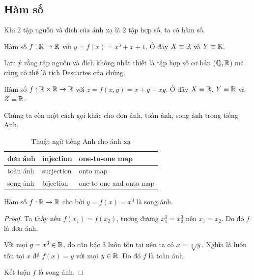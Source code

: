 \subsection*{Hàm số}

Khi 2 tập nguồn và đích của ánh xạ là 2 tập hợp số, ta có hàm số.

\begin{example}
    Hàm số $f: \mathbb{R} \rightarrow \mathbb{R}$ với $y = f(x) = x^3 + x + 1$. Ở đây $X \equiv \mathbb{R}$ và $Y \equiv \mathbb{R}$.
\end{example}

Lưu ý rằng tập nguồn và đích không nhất thiết là tập hợp số cơ bản ($\mathbb{Q}, \mathbb{R}$) mà cũng có thể là tích Descartes của chúng.

\begin{example}
    Hàm số $f: \mathbb{R} \times \mathbb{R} \rightarrow \mathbb{R}$ với $z = f(x, y) = x + y + xy$. Ở đây $X \equiv \mathbb{R}$, $Y \equiv \mathbb{R}$ và $Z \equiv \mathbb{R}$.
\end{example}

Chúng ta còn một cách gọi khác cho đơn ánh, toàn ánh, song ánh trong tiếng Anh.

\begin{table}[ht]
    \centering
    \begin{tabular}{| l | l | l |}
        \hline
        đơn ánh & injection & one-to-one map \\
        \hline
        toàn ánh & surjection & onto map \\
        \hline
        song ánh & bijection & one-to-one and onto map \\
        \hline
    \end{tabular}

    \caption{Thuật ngữ tiếng Anh cho ánh xạ}
\end{table}

\begin{example}
    Hàm số $f: \mathbb{R} \rightarrow \mathbb{R}$ cho bởi $y = f(x) = x^3$ là song ánh.

    \begin{proof}
        Ta thấy nếu $f(x_1) = f(x_2)$, tương đương $x_1^3 = x_2^3$ nên $x_1 = x_2$. Do đó $f$ là đơn ánh.

        Với mọi $y = x^3 \in \mathbb{R}$, do căn bậc 3 luôn tồn tại nên ta có $x = \sqrt[3]{y}$. Nghĩa là luôn tồn tại $x$ để $f(x) = y$ với mọi $y \in \mathbb{R}$. Do đó $f$ là toàn ánh.

        Kết luận $f$ là song ánh.
    \end{proof}
\end{example}

